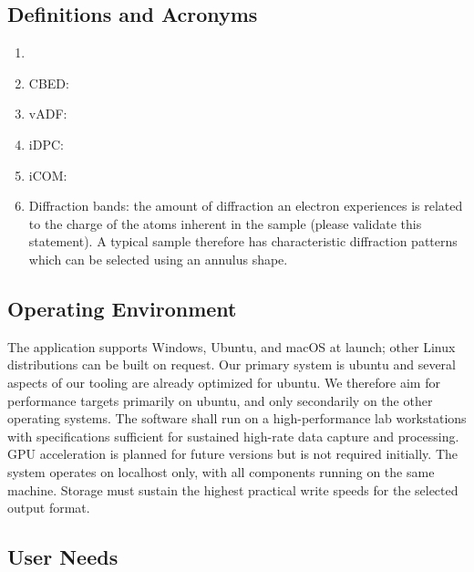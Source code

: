 \documentclass[10pt]{article}
\begin{document}
    \subsection{Definitions and Acronyms}
    \begin{enumerate}
        \item <expand and define>
        \item CBED:
        \item vADF:
        \item iDPC:
        \item iCOM:
        \item Diffraction bands: the amount of diffraction an electron experiences is related to the charge of the atoms inherent in the sample (please validate this statement). A typical sample therefore has characteristic diffraction patterns which can be selected using an annulus shape.
    \end{enumerate}

    \subsection{Operating Environment}\label{subsec:operating-environment}
    The application supports Windows, Ubuntu, and macOS at launch; other Linux distributions can be built on request. Our primary system is ubuntu and several aspects of our tooling are already optimized for ubuntu. We therefore aim for performance targets primarily on ubuntu, and only secondarily on the other operating systems. The software shall run on a high-performance lab workstations with specifications sufficient for sustained high-rate data capture and processing. GPU acceleration is planned for future versions but is not required initially. The system operates on localhost only, with all components running on the same machine. Storage must sustain the highest practical write speeds for the selected output format.

    \subsection{User Needs}
\end{document}
